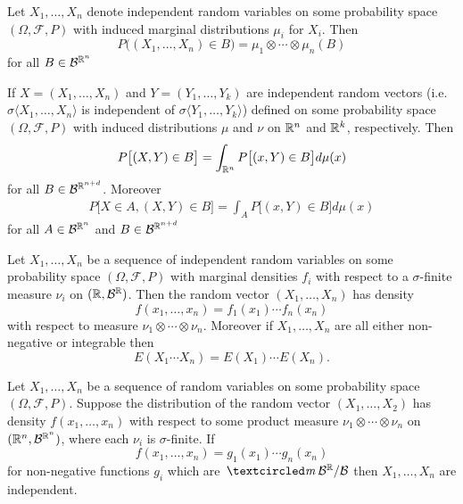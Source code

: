 



\begin{theorem}
Let $X_1,\ldots, X_n$ denote independent random variables on some probability space $(\Omega, \mathcal F, P)$ with  induced marginal distributions $\mu_i$ for $X_i$. Then
\[ P\bigl((X_1,\ldots,X_n) \in B\bigr) =\mu_1\otimes \cdots \otimes \mu_n(B)\]
for all $B\in \mathcal B^{\Bbb R^n}$
\end{theorem}

\begin{theorem}
\label{thm: Law of total probability}
If $X=(X_1,\ldots, X_n)$ and $Y=(Y_1,\ldots, Y_k)$ are independent random vectors (i.e. $\sigma\langle X_1,\ldots,X_n\rangle$ is independent of $\sigma\langle Y_1,\ldots, Y_k \rangle$) defined on some probability space $(\Omega, \mathcal F, P)$ with induced distributions $\mu$ and $\nu$ on $\Bbb R^n$ and $\Bbb R^k$, respectively. Then
\begin{align*}
P\bigl[(X,Y)\in B\bigr]=\int_{\Bbb R^n} P\bigl[(x,Y)\in B\bigr] d\mu(x)
\end{align*}
 for all $B\in\mathcal B^{\Bbb R^{n+d}}$. Moreover
 \begin{align*}
P\bigl[X\in A,(X,Y)\in B\bigr]=\int_{A} P\bigl[(x,Y)\in B\bigr] d\mu(x)
\end{align*}
 for all $A\in \mathcal B^{\Bbb R^{n}}$ and $B\in\mathcal B^{\Bbb R^{n+d}}$
\end{theorem}

\begin{theorem}
Let $X_1,\ldots, X_n$ be a sequence of independent random variables on some probability space $(\Omega, \mathcal F, P)$ with marginal densities $f_i$ with respect to a $\sigma$-finite measure $\nu_i$ on $(\Bbb R, \mathcal B^{\Bbb R})$. Then the random vector $(X_1,\ldots, X_n)$ has density
\[ f(x_1,\ldots, x_n)=f_1(x_1)\cdots f_n(x_n) \]
with respect to measure $\nu_1\otimes \cdots\otimes \nu_n$. Moreover
 if $X_1,\ldots, X_n$ are all either non-negative or integrable then
 \[ E(X_1\cdots X_n)=E(X_1)\cdots E(X_n). \]
 \end{theorem}

 \begin{theorem}
 Let $X_1,\ldots, X_n$ be a sequence of random variables on some probability space $(\Omega, \mathcal F, P)$. Suppose the distribution of the random vector $(X_1,\ldots, X_2)$ has density $f(x_1,\ldots, x_n)$ with respect to some product measure $\nu_1\otimes \cdots \otimes \nu_n$ on $(\Bbb R^n,\mathcal B^{\Bbb R^n})$, where each $\nu_i$ is $\sigma$-finite. If
 \[ f(x_1,\ldots, x_n)=g_1(x_1)\cdots g_n(x_n) \]
for non-negative functions $g_i$ which are $\mcirc \mathcal B^{\Bbb R}/\mathcal B$ then $X_1,\ldots, X_n$ are independent.
 \end{theorem}





